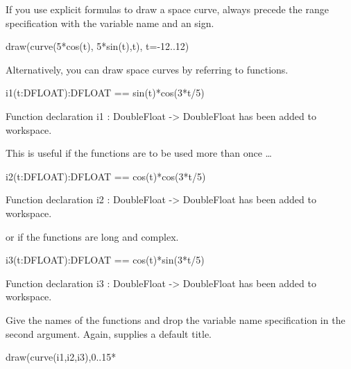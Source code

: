 %
\begin{psXtc}
\begin{xtccomment}
If you use explicit formulas to draw a space curve, always precede
the range specification with the variable name and an
\spadSyntax{=} sign.
\end{xtccomment}
\begin{spadsrc}
draw(curve(5*cos(t), 5*sin(t),t), t=-12..12)
\end{spadsrc}
\end{psXtc}
%
\begin{xtc}
\begin{xtccomment}
Alternatively, you can draw space curves by referring to functions.
\end{xtccomment}
\begin{spadsrc}
i1(t:DFLOAT):DFLOAT == sin(t)*cos(3*t/5) 
\end{spadsrc}
\begin{MessageOutput}
   Function declaration i1 : DoubleFloat -> DoubleFloat has been added 
      to workspace.
\end{MessageOutput}
\end{xtc}
\begin{xtc}
\begin{xtccomment}
This is useful if the functions are to be used more than once \ldots
\end{xtccomment}
\begin{spadsrc}
i2(t:DFLOAT):DFLOAT == cos(t)*cos(3*t/5) 
\end{spadsrc}
\begin{MessageOutput}
   Function declaration i2 : DoubleFloat -> DoubleFloat has been added 
      to workspace.
\end{MessageOutput}
\end{xtc}
\begin{xtc}
\begin{xtccomment}
or if the functions are long and complex.
\end{xtccomment}
\begin{spadsrc}
i3(t:DFLOAT):DFLOAT == cos(t)*sin(3*t/5) 
\end{spadsrc}
\begin{MessageOutput}
   Function declaration i3 : DoubleFloat -> DoubleFloat has been added 
      to workspace.
\end{MessageOutput}
\end{xtc}
%
%
\begin{psXtc}
\begin{xtccomment}
Give the names of the functions and
drop the variable name specification in the second argument.
Again, \Language{} supplies a default title.
\end{xtccomment}
\begin{spadsrc}
draw(curve(i1,i2,i3),0..15*%
\end{spadsrc}
\end{psXtc}

